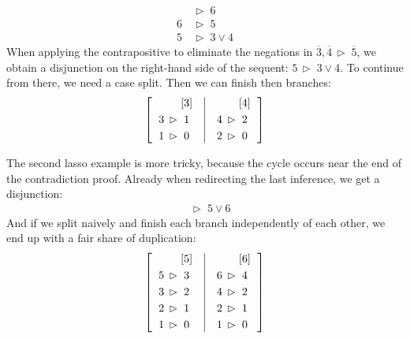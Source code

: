 \documentclass[withtimes,a4paper,12pt]{easychair}
\let\B=\overline
\newcommand\have{\mathrel{\,\vartriangleright\;}}
\begin{document}
%
\begin{align*}
& \have 6 \\
6 & \have 5 \\
5 & \have 3 \lor 4
\end{align*}
%
When applying the contrapositive to eliminate the negations in $\B 3, \B 4 \have
\B 5$, we obtain a disjunction on the right-hand side of the sequent: $5 \have 3
\lor 4$. To continue from there, we need a case split. Then we can finish then
branches:
%
\[\left[\begin{tabular}{l|l} %
    $\begin{aligned}[t]
      [&3] \\
      3 \have {} & 1 \\
      1 \have {} & 0
    \end{aligned}$\enskip\hbox{}&\enskip
    $\begin{aligned}[t] 
      [&4] \\
      4 \have {} & 2 \\
      2 \have {} & 0
    \end{aligned}$
  \end{tabular}\right]\]

The second lasso example is more tricky, because the cycle occurs near the end
of the contradiction proof. Already when redirecting the last inference, we get
a disjunction:
%
\begin{align*}
& \have 5 \lor 6
\end{align*}
%
And if we split naively and finish each branch independently of each other,
we end up with a fair share of duplication:
\pagebreak[3]
\[\left[\begin{tabular}{l|l} %
    $\begin{aligned}[t]
      [&5] \\
      5 \have {} & 3 \\
      3 \have {} & 2 \\
      2 \have {} & 1 \\
      1 \have {} & 0 \\
    \end{aligned}$\enskip\hbox{}&\enskip
    $\begin{aligned}[t] 
      [&6] \\
      6 \have {} & 4 \\
      4 \have {} & 2 \\
      2 \have {} & 1 \\
      1 \have {} & 0 \\
    \end{aligned}$
  \end{tabular}\right]\]
\end{document}
